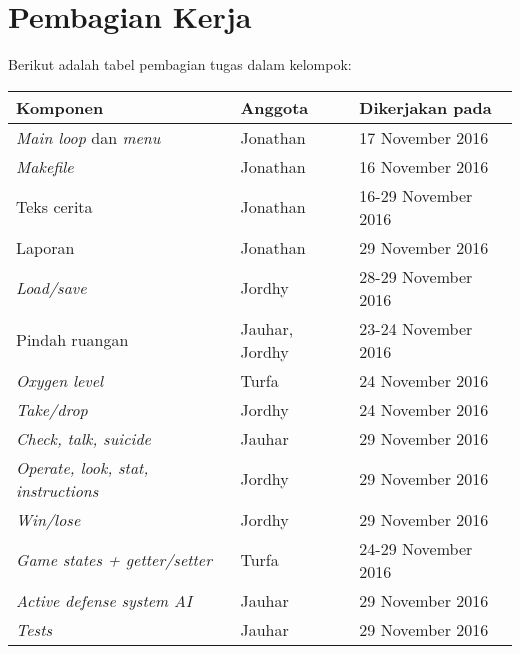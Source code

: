 \documentclass[a4paper,titlepage]{article}
\begin{document}
		


	\section{Pembagian Kerja}

		\noindent Berikut adalah tabel pembagian tugas dalam kelompok:

		\begin{table}[H]
			\centering
			\begin{tabular}{@{}lll@{}}
				\toprule
				Komponen & Anggota & Dikerjakan pada \\ \midrule
				\textit{Main loop} dan \textit{menu} & Jonathan & 17 November 2016 \\
				\textit{Makefile} & Jonathan & 16 November 2016 \\
				Teks cerita & Jonathan & 16-29 November 2016 \\
				Laporan & Jonathan & 29 November 2016 \\
				\textit{Load/save} & Jordhy & 28-29 November 2016 \\
				Pindah ruangan & Jauhar, Jordhy & 23-24 November 2016 \\
				\textit{Oxygen level} & Turfa & 24 November 2016 \\
				\textit{Take/drop} & Jordhy & 24 November 2016 \\
				\textit{Check, talk, suicide} & Jauhar & 29 November 2016 \\
				\textit{Operate, look, stat, instructions} & Jordhy & 29 November 2016 \\
				\textit{Win/lose} & Jordhy & 29 November 2016 \\
				\textit{Game states + getter/setter} & Turfa & 24-29 November 2016 \\
				\textit{Active defense system AI} & Jauhar & 29 November 2016 \\
				\textit{Tests} & Jauhar & 29 November 2016 \\
			\end{tabular}
		\end{table}
\end{document}
